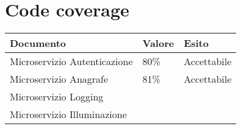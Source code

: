 \section{Code coverage}

\begin{center}
    \begin{xltabular}{\linewidth}{|l|l|l|}
    \hline
    \textbf{Documento} & \textbf{Valore} & \textbf{Esito} \\
    \hline
     Microservizio Autenticazione & 80\% & Accettabile \\
     Microservizio Anagrafe & 81\% & Accettabile \\
     Microservizio Logging &  &  \\
     Microservizio Illuminazione &  &  \\
    \hline

    \end{xltabular}
\end{center}